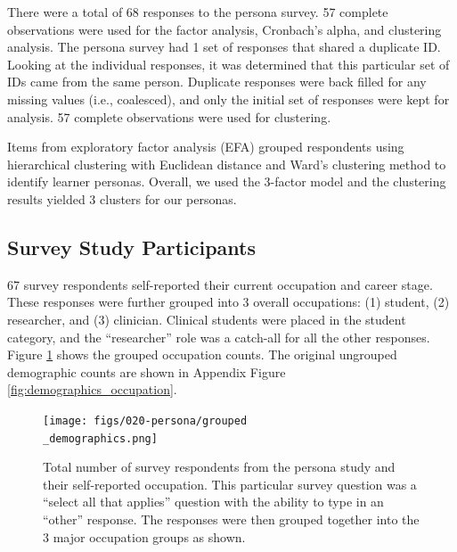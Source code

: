 \documentclass[020-persona\_validation.tex]{subfiles}
\begin{document}
    There were a total of 68 responses to the persona survey.
    57 complete observations %
    were used for the factor analysis, Cronbach's alpha, and clustering analysis.
    The persona survey had 1 set of responses %
    that shared a duplicate ID.
    Looking at the individual responses,
    it was determined that this particular set of IDs came from the same person.
    Duplicate responses were back filled for any missing values (i.e., coalesced),
    and only the initial set of responses were kept for analysis.
    57 complete observations %
    were used for clustering.

    Items from exploratory factor analysis (EFA) grouped respondents
    using hierarchical clustering with Euclidean distance and Ward's clustering method
    to identify learner personas.
    Overall,
    we used the 3-factor model and the clustering results yielded 3 clusters for our personas.

    \subsection{Survey Study Participants}

        67 survey respondents self-reported their current occupation and career stage.
        These responses were further grouped into 3 overall occupations:
        (1) student,
        (2) researcher, and
        (3) clinician.
        Clinical students were placed in the student category,
        and the ``researcher'' role was a catch-all for all the other responses.
        Figure \ref{fig:groupeddemographics} shows the grouped occupation counts.
        The original ungrouped demographic counts are shown in Appendix Figure \ref{fig:demographics_occupation}.

        \begin{figure}[htb]
            \centering
            \texttt{[image: figs/020-persona/grouped\\\_demographics.png]}
            \caption[Grouped demographics for persona survey respondents]{
            Total number of survey respondents from the persona study and their self-reported occupation.
                This particular survey question was a ``select all that applies''
                question with the ability to type in an ``other'' response.
                The responses were then grouped together into the 3 major occupation groups as shown.}
            \label{fig:groupeddemographics}
        \end{figure}
\end{document}
